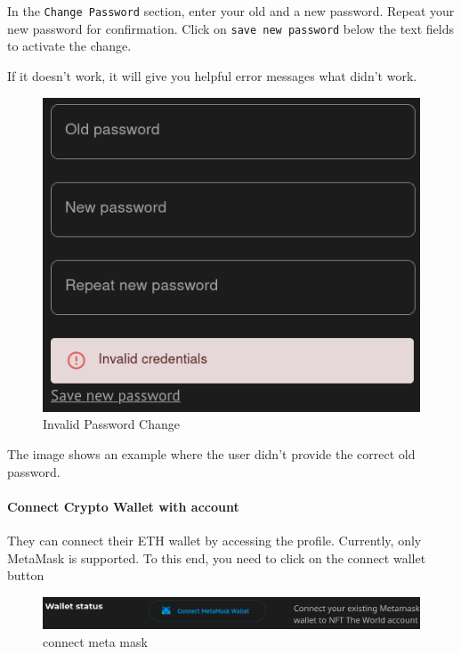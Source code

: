 \documentclass[
]{article}
\begin{document}
In the \texttt{Change\ Password} section, enter your old and a new
password. Repeat your new password for confirmation. Click on
\texttt{save\ new\ password} below the text fields to activate the
change.

If it doesn't work, it will give you helpful error messages what didn't
work.

\begin{figure}
\centering
\includegraphics{images/invalid_password_change.png}
\caption{Invalid Password Change}
\end{figure}\newpage

The image shows an example where the user didn't provide the correct old
password.

\hypertarget{connect-crypto-wallet-with-account}{%
\paragraph{Connect Crypto Wallet with
account}\label{connect-crypto-wallet-with-account}}

They can connect their ETH wallet by accessing the profile. Currently,
only MetaMask is supported. To this end, you need to click on the
connect wallet button

\begin{figure}
\centering
\includegraphics{images/profile_connect_wallet.png}
\caption{connect meta mask}
\end{figure}
\end{document}
